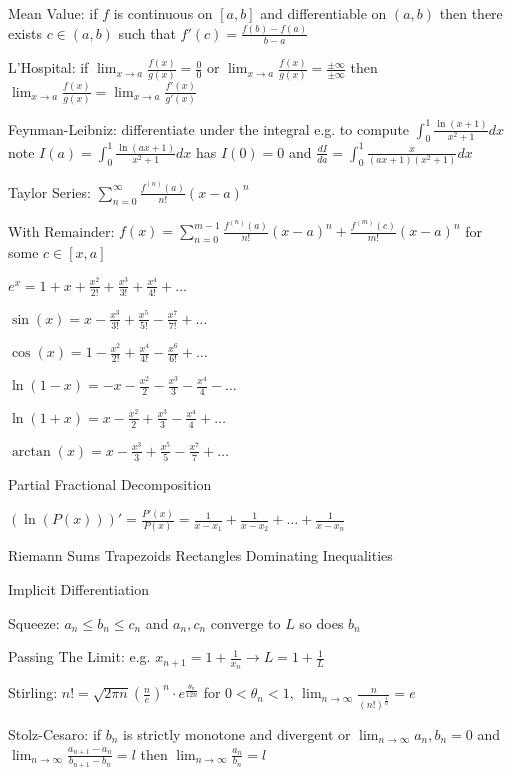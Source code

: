 Mean Value: if $f$ is continuous on $[a,b]$ and differentiable on $(a,b)$ then there exists $c \in (a,b)$ such that $f'(c) = \frac{f(b)-f(a)}{b-a}$

L'Hospital: if $\lim_{x \to a} \frac{f(x)}{g(x)} = \frac{0}{0}$ or $\lim_{x \to a} \frac{f(x)}{g(x)} = \frac{\pm \infty}{\pm \infty}$ then $\lim_{x \to a} \frac{f(x)}{g(x)} = \lim_{x \to a} \frac{f'(x)}{g'(x)}$

Feynman-Leibniz: differentiate under the integral e.g. to compute $\int_0^1 \frac{\ln(x+1)}{x^2+1} dx$ note $I(a) = \int_0^1 \frac{\ln(ax+1)}{x^2+1} dx$ has $I(0)=0$ and $\frac{dI}{da} = \int_0^1 \frac{x}{(ax+1)(x^2+1)} dx$

Taylor Series: $\sum_{n=0}^{\infty} \frac{f^{(n)}(a)}{n!} (x-a)^n$

With Remainder: $f(x)=\sum_{n=0}^{m-1} \frac{f^{(n)}(a)}{n!} (x-a)^n + \frac{f^{(m)}(c)}{m!} (x-a)^n$ for some $c \in [x,a]$

$e^x = 1+x+\frac{x^2}{2!}+\frac{x^3}{3!}+\frac{x^4}{4!}+\dots$

$\sin(x) = x-\frac{x^3}{3!}+\frac{x^5}{5!}-\frac{x^7}{7!}+\dots$

$\cos(x) = 1-\frac{x^2}{2!}+\frac{x^4}{4!}-\frac{x^6}{6!}+\dots$

$\ln (1-x) = -x-\frac{x^2}{2}-\frac{x^3}{3}-\frac{x^4}{4}-\dots$

$\ln (1+x) = x-\frac{x^2}{2}+\frac{x^3}{3}-\frac{x^4}{4}+\dots$

$\arctan (x) = x-\frac{x^3}{3}+\frac{x^5}{5}-\frac{x^7}{7}+\dots$

Partial Fractional Decomposition

$(\ln(P(x)))' = \frac{P'(x)}{P(x)} = \frac{1}{x-x_1} + \frac{1}{x-x_2} + \dots + \frac{1}{x-x_n}$

Riemann Sums Trapezoids Rectangles Dominating Inequalities

Implicit Differentiation

Squeeze: $a_n \le b_n \le c_n$ and $a_n,c_n$ converge to $L$ so does $b_n$

Passing The Limit: e.g. $x_{n+1}=1+\frac{1}{x_n} \to L=1+\frac{1}{L}$

Stirling: $n! = \sqrt{2 \pi n} \left(\frac{n}{e} \right)^n \cdot e^{\frac{\theta_n}{12n}}$ for $0 < \theta_n < 1$, $\lim_{n \to \infty} \frac{n}{(n!)^{\frac{1}{n}}} = e$

Stolz-Cesaro: if $b_n$ is strictly monotone and divergent or $\lim_{n \to \infty} a_n, b_n = 0$ and $\lim_{n \to \infty} \frac{a_{n+1}-a_n}{b_{n+1}-b_n} = l$ then $\lim_{n \to \infty} \frac{a_n}{b_n} = l$

